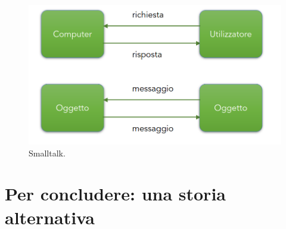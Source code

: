 \begin{figure}[h]
    \centering
    \includegraphics[scale=0.5]{images/Small.png}
    \caption{Smalltalk.}
\end{figure}


\section{Per concludere: una storia alternativa}


